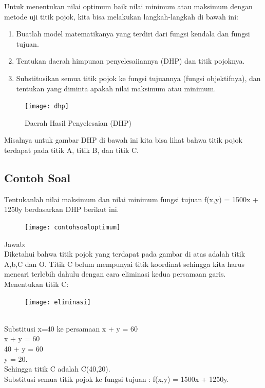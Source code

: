 \documentclass[11pt,fleqn]{book} %
\begin{document}
Untuk menentukan nilai optimum baik nilai minimum atau maksimum dengan metode uji titik pojok, kita bisa melakukan langkah-langkah di bawah ini:
\begin{enumerate}
\item Buatlah model matematikanya yang terdiri dari fungsi kendala dan fungsi tujuan.
\item Tentukan daerah himpunan penyelesaiiannya (DHP) dan titik pojoknya.
\item Substitusikan semua titik pojok ke fungsi tujuannya (fungsi objektifnya), dan tentukan yang diminta apakah nilai maksimum atau minimum.
\end{enumerate}
\begin{figure}[h]
\centering\texttt{[image: dhp]}
\caption{Daerah Hasil Penyelesaian (DHP)}
\end{figure}

Misalnya untuk gambar DHP di bawah ini kita bisa lihat bahwa titik pojok terdapat pada titik A, titik B, dan titik C.
\subsection{Contoh Soal}

\begin{example}
Tentukanlah nilai maksimum dan nilai minimum fungsi tujuan f(x,y) = 1500x + 1250y berdasarkan DHP berikut ini.
\begin{figure}[h]
\centering\texttt{[image: contohsoaloptimum]}
\end{figure}
\end{example}
Jawab:\\
Diketahui bahwa titik pojok yang terdapat pada gambar di atas adalah titik A,b,C dan O. Titik C belum mempunyai titik koordinat sehingga kita harus mencari terlebih dahulu dengan cara eliminasi kedua persamaan garis.\\
Menentukan titik C:
\begin{figure}[h]
\centering\texttt{[image: eliminasi]}
\end{figure}\\
Substitusi x=40 ke persamaan x + y = 60\\
x + y = 60\\
40 + y = 60\\
y = 20.\\
Sehingga titik C adalah C(40,20).\\
Substitusi semua titik pojok ke fungsi tujuan : f(x,y) = 1500x + 1250y.\\
\end{document}
